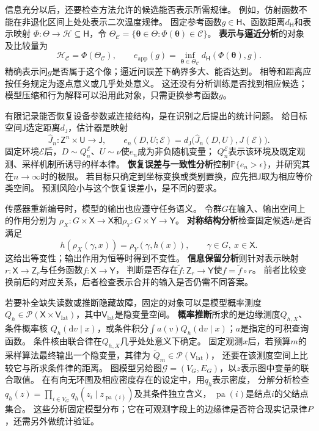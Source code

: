 信息充分以后，还要检查方法允许的候选能否表示所需规律。
例如，仿射函数不能在非退化区间上处处表示二次温度规律。
固定参考函数$g\in\mathsf H$、函数距离$d_{\mathsf H}$和表示映射
$\Phi:\Theta\to\mathcal H\subseteq\mathsf H$，令
$\Theta_{\mathcal C}=\{\bm\theta\in\Theta:\Phi(\bm\theta)\in\mathcal C\}$。
\textbf{表示与逼近分析}的对象及比较量为
\[
  \mathcal H_{\mathcal C}=\Phi(\Theta_{\mathcal C}),\qquad
  e_{\mathrm{app}}(g)=
  \inf_{\bm\theta\in\Theta_{\mathcal C}}
       d_{\mathsf H}(\Phi(\bm\theta),g).
\]
精确表示问$g$是否属于这个像；逼近问误差下确界多大、能否达到。
相等和距离应按任务规定为逐点意义或几乎处处意义。
这还没有分析训练是否找到相应候选；模型压缩和行为解释可以沿用此对象，只需更换参考函数$g$。

有限记录能否恢复设备参数或连接结构，是在识别之后提出的统计问题。
给目标空间$\mathsf J$选定距离$d_{\mathsf J}$，估计器是映射
\[
  \widehat J_n:\mathsf Z^n\times\mathsf U\to\mathsf J,
  \qquad
  e_n(D,U;\mathcal E)=
  d_{\mathsf J}\bigl(\widehat J_n(D,U),J(\mathcal E)\bigr).
\]
固定环境$\mathcal E$后，$D\sim Q_n^{\mathcal E}$、$U\sim\nu$使$e_n$成为非负随机变量；
$Q_n^{\mathcal E}$表示该环境及既定观测、采样机制所诱导的样本律。
\textbf{恢复误差与一致性分析}控制$\mathbb P\{e_n>\epsilon\}$，并研究其在$n\to\infty$时的极限。
若目标只确定到坐标变换或类别置换，应先把$\mathsf J$取为相应等价类空间。
预测风险小与这个恢复误差小，是不同的要求。

传感器重新编号时，模型的输出也应遵守任务语义。
令群$G$在输入、输出空间上的作用分别为
$\rho_X:G\times\mathsf X\to\mathsf X$和$\rho_Y:G\times\mathsf Y\to\mathsf Y$。
\textbf{对称结构分析}检查固定候选$h$是否满足
\[
  h(\rho_X(\gamma,x))=\rho_Y(\gamma,h(x)),
  \qquad \gamma\in G,\ x\in\mathsf X.
\]
这给出等变性；输出作用为恒等时得到不变性。
\textbf{信息保留分析}则针对表示映射$r:\mathsf X\to\mathsf Z_r$与任务函数$f:\mathsf X\to\mathsf Y$，
判断是否存在$\widetilde f:\mathsf Z_r\to\mathsf Y$使$f=\widetilde f\circ r$。
前者比较变换前后的对应关系，后者检查表示合并的输入是否仍需不同答案。

若要补全缺失读数或推断隐藏故障，固定的对象可以是模型概率测度
$Q_h\in\mathcal P(\mathsf X\times\mathsf V_{\mathrm{lat}})$，其中$\mathsf V_{\mathrm{lat}}$是隐变量空间。
\textbf{概率推断}所求的是边缘测度$Q_{h,X}$、条件概率核
$Q_h(\mathrm dv\mid x)$，或条件积分$\int a(v)Q_h(\mathrm dv\mid x)$；$a$是指定的可积查询函数。
条件核由联合律在$Q_{h,X}$几乎处处意义下确定。
固定观测$x$后，若预算$m$的采样算法最终输出一个隐变量，其律为
$\widetilde Q_m\in\mathcal P(\mathsf V_{\mathrm{lat}})$，
还要在该测度空间上比较它与所求条件律的距离。
图模型另给图$\mathcal G=(V_G,E_G)$，以$z$表示图中变量的联合取值。
在有向无环图及相应密度存在的设定中，用$q_h$表示密度，
分解分析检查$q_h(z)=\prod_{i\in V_G}q_h(z_i\mid z_{\operatorname{pa}(i)})$及其条件独立含义，
$\operatorname{pa}(i)$是结点$i$的父结点集合。
这些分析固定模型分布；它在可观测字段上的边缘律是否符合现实记录律$P$，还需另外做统计验证。

